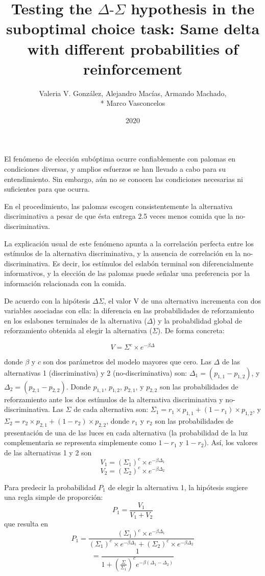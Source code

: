 \documentclass[a4paper,12pt]{article}
\title{Testing the $\Delta\mbox{-}\Sigma$ hypothesis in the suboptimal choice task: Same delta with different probabilities of reinforcement}
\author{Valeria V. González, Alejandro Macías, Armando Machado,\\*
	Marco Vasconcelos}
\date{2020}
\begin{document}
{\bfseries \maketitle}

El fenómeno de elección subóptima ocurre confiablemente con palomas en condiciones diversas, y amplios esfuerzos se han llevado a cabo para su entendimiento. Sin embargo, aún no se conocen las condiciones necesarias ni suficientes para que ocurra.

En el procedimiento, las palomas escogen consistentemente la alternativa discriminativa a pesar de que ésta entrega 2.5 veces menos comida que la no-discriminativa.

La explicación usual de este fenómeno apunta a la correlación perfecta entre los estímulos de la alternativa discriminativa, y la ausencia de correlación en la no-discriminativa. Es decir, los estímulos del eslabón terminal son diferencialmente informativos, y la elección de las palomas puede señalar una preferencia por la información relacionada con la comida.

De acuerdo con la hipótesis $\Delta\Sigma$, el valor V de una alternativa incrementa con dos variables asociadas con ella: la diferencia en las probabilidades de reforzamiento en los eslabones terminales de la alternativa ($\Delta$) y la probabilidad global de reforzamiento obtenida al elegir la alternativa ($\Sigma$). De forma concreta:

$$V=\Sigma^c\times e^{-\beta\Delta}$$

donde $\beta$ y $c$ son dos parámetros del modelo mayores que cero. Las $\Delta$ de las alternativas 1 (discriminativa) y 2 (no-discriminativa) son: $\Delta_1=(p_{1,1} - p_{1,2})$, y ${\Delta_2=(p_{2,1}-p_{2,2})}$. Donde $p_{1,1}$, $p_{1,2}$, $p_{2,1}$, y $p_{2,2}$ son las probabilidades de reforzamiento ante los dos estímulos de la alternativa discriminativa y no-discriminativa. Las $\Sigma$ de cada alternativa son: ${\Sigma_1=r_1\times p_{1,1}+(1-r_1)\times p_{1,2}}$, y ${\Sigma_2=r_2\times p_{2,1}+(1-r_2)\times p_{2,2}}$, donde $r_1$ y $r_2$ son las probabilidades de presentación de una de las luces en cada alternativa (la probabilidad de la luz complementaria se representa simplemente como $1-r_1$ y $1-r_2$). Así, los valores de las alternativas 1 y 2 son
$$V_1=(\Sigma_1)^c\times e^{-\beta\Delta_1}$$
$$V_2=(\Sigma_2)^c\times e^{-\beta\Delta_2}$$

Para predecir la probabilidad $P_1$ de elegir la alternativa 1, la hipótesis sugiere una regla simple de proporción:
$$P_1=\frac{V_1}{V_1+V_2}$$
que resulta en
$$P_1=\frac{(\Sigma_1)^c\times e^{-\beta\Delta_1}}{(\Sigma_1)^c\times e^{-\beta\Delta_1}+(\Sigma_2)^c\times e^{-\beta\Delta_2}}$$
$$=\frac{1}{1+\left(\frac{\Sigma}{\Sigma_1}\right)^ce^{-\beta(\Delta_1-\Delta_2)}}$$
\end{document}
